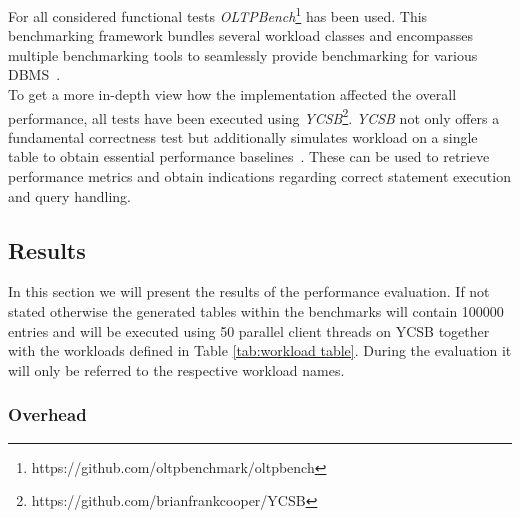 For all considered functional tests \textit{OLTPBench}\footnote{https://github.com/oltpbenchmark/oltpbench} 
has been used. This benchmarking framework bundles several workload classes and 
encompasses multiple benchmarking tools to seamlessly provide benchmarking for various DBMS~\cite{oltp_2013}.\\
To get a more in-depth view how the implementation affected the overall performance, all tests have been executed 
using \textit{YCSB}\footnote{https://github.com/brianfrankcooper/YCSB}.
\textit{YCSB} not only offers a fundamental correctness test but additionally simulates workload on a single table to obtain essential performance baselines~\cite{ycsb_2010}.
These can be used to retrieve performance metrics and obtain indications regarding correct statement execution and query handling.



\subsection{Results}
\label{sec:results}
In this section we will present the results of the performance evaluation.
If not stated otherwise the generated tables within the benchmarks will contain 100000 entries and will be executed using
50 parallel client threads on YCSB together with the workloads defined in Table \ref{tab:workload table}.
During the evaluation it will only be referred to the respective workload names.
  

           

\subsubsection{Overhead} 

